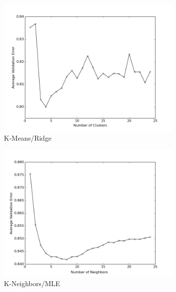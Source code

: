 \documentclass[11pt]{article}
\begin{document}
\begin{figure}[h!]
    \begin{subfigure}[h!]{0.33\textwidth}
        \includegraphics[width=\textwidth]{NL_kMeans_ridge.png}
        \caption{K-Means/Ridge}
        \label{fig:kmBEST}
    \end{subfigure}%
    \begin{subfigure}[h!]{0.33\textwidth}
        \includegraphics[width=\textwidth]{NL_KN_mle.png}
        \caption{K-Neighbors/MLE}
        \label{fig:knBEST}
    \end{subfigure}
    \begin{subfigure}[h!]{0.33\textwidth}

\end{subfigure}
\end{figure}
\end{document}
